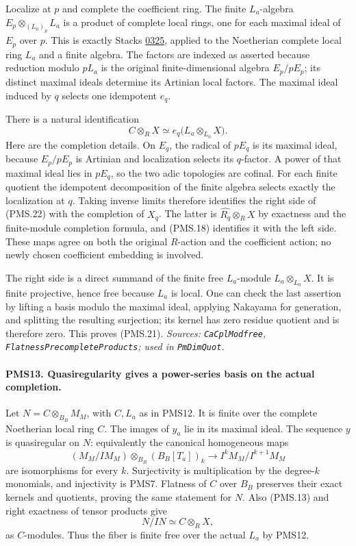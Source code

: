 Localize at $p$ and complete the coefficient ring.  The finite
$L_a$-algebra $E_p\otimes_{(L_0)_p}L_a$ is a product of complete
local rings, one for each maximal ideal of $E_p$ over $p$.
This is exactly Stacks
\href{https://stacks.math.columbia.edu/tag/0325}{0325}, applied
to the Noetherian complete local ring $L_a$ and a finite algebra.
The factors are indexed as asserted because reduction modulo
$pL_a$ is the original finite-dimensional algebra $E_p/pE_p$;
its distinct maximal ideals determine its Artinian local factors.
The maximal ideal induced by $q$ selects one idempotent $e_q$.

There is a natural identification
\[
 C\otimes_R X\simeq
 e_q\bigl(L_a\otimes_{L_0}X\bigr).               \tag{PMS.22}
\]
Here are the completion details.  On $E_q$, the radical of
$pE_q$ is its maximal ideal, because $E_p/pE_p$ is Artinian and
localization selects its $q$-factor.  A power of that maximal
ideal lies in $pE_q$, so the two adic topologies are cofinal.
For each finite quotient the idempotent decomposition of the
finite algebra selects exactly the localization at $q$.
Taking inverse limits therefore identifies the right side of
(PMS.22) with the completion of $X_q$.
The latter is $\widehat{R_q}\otimes_R X$ by exactness and the
finite-module completion formula, and (PMS.18) identifies it with
the left side.  These maps agree on both the original $R$-action
and the coefficient action; no newly chosen coefficient embedding
is involved.

The right side is a direct summand of the finite free $L_a$-module
$L_a\otimes_{L_0}X$.  It is finite projective, hence free because
$L_a$ is local.  One can check the last assertion by lifting a
basis modulo the maximal ideal, applying Nakayama for generation,
and splitting the resulting surjection; its kernel has zero
residue quotient and is therefore zero.  This proves (PMS.21).
\hfill\textit{Sources: \texttt{CaCplModfree},
\texttt{FlatnessPrecompleteProducts}; used in \texttt{PmDimQuot}.}

\paragraph{PMS13. Quasiregularity gives a power-series basis on the actual completion.}
\label{claim:PMS13}
Let $N=C\otimes_{B_B}M_M$, with $C,L_a$ as in PMS12.
It is finite over the complete Noetherian local ring $C$.
The images of $y_a$ lie in its maximal ideal.
The sequence $y$ is quasiregular on $N$: equivalently the
canonical homogeneous maps
\[
 (M_M/IM_M)\otimes_{B_B}(B_B[T_a])_k
       \longrightarrow I^kM_M/I^{k+1}M_M
\]
are isomorphisms for every $k$.  Surjectivity is multiplication
by the degree-$k$ monomials, and injectivity is PMS7.
Flatness of $C$ over $B_B$ preserves their exact kernels and
quotients, proving the same statement for $N$.
Also (PMS.13) and right exactness of tensor products give
\[
 N/IN\simeq C\otimes_R X,                        \tag{PMS.23}
\]
as $C$-modules.  Thus the fiber is finite free over the actual
$L_a$ by PMS12.

